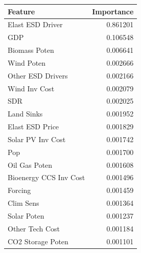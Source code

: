 \begin{tabular}{lr}
\toprule
Feature & Importance \\
\midrule
Elast ESD Driver & 0.861201 \\
GDP & 0.106548 \\
Biomass Poten & 0.006641 \\
Wind Poten & 0.002666 \\
Other ESD Drivers & 0.002166 \\
Wind Inv Cost & 0.002079 \\
SDR & 0.002025 \\
Land Sinks & 0.001952 \\
Elast ESD Price & 0.001829 \\
Solar PV Inv Cost & 0.001742 \\
Pop & 0.001700 \\
Oil Gas Poten & 0.001608 \\
Bioenergy CCS Inv Cost & 0.001496 \\
Forcing & 0.001459 \\
Clim Sens & 0.001364 \\
Solar Poten & 0.001237 \\
Other Tech Cost & 0.001184 \\
CO2 Storage Poten & 0.001101 \\
\bottomrule
\end{tabular}
